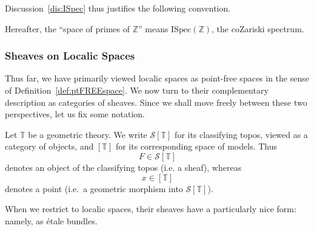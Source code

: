 \documentclass[a4paper, 11pt,reqno]{amsart}
\newcommand{\opp}{\mathrm{op}}    %
\newcommand{\ISpec}{\mathrm{ISpec}}
\newcommand{\LSpec}{\mathrm{LSpec}}
\newcommand{\baseS}{\mathcal{S}}
\newcommand{\thT}{\mathbb{T}}
\newcommand{\Z}{\mathbb{Z}}
\begin{document}
Discussion~\ref{dis:ISpec} thus justifies the following convention.

\begin{convention} Hereafter, the ``space of primes of $\Z$'' means $\ISpec(\Z)$, the coZariski spectrum.
\end{convention}




\subsubsection{Sheaves on Localic Spaces}\label{sec:etale-bundles} Thus far, we have primarily viewed localic spaces as point-free spaces in the sense of Definition~\ref{def:ptFREEspace}. We now turn to their complementary description as categories of sheaves. Since we shall
move freely between these two perspectives, let us fix some notation.

	\begin{convention}\label{conv:TvsST} Let $\thT$ be a geometric theory. We write $\baseS[\thT]$ for its classifying topos, viewed as a category of objects, and $[\thT]$ for its corresponding space of models. %
	Thus
		\[
		F\in\baseS[\thT]
		\]
		denotes an object of the classifying topos (i.e. a sheaf), whereas
		\[
		x\in[\thT]
		\]
		denotes a point (i.e.\ a geometric morphism into $\baseS[\thT]$).
\end{convention}

When we restrict to localic spaces, their sheaves have a particularly nice form: namely, as \'{e}tale bundles.
\end{document}
